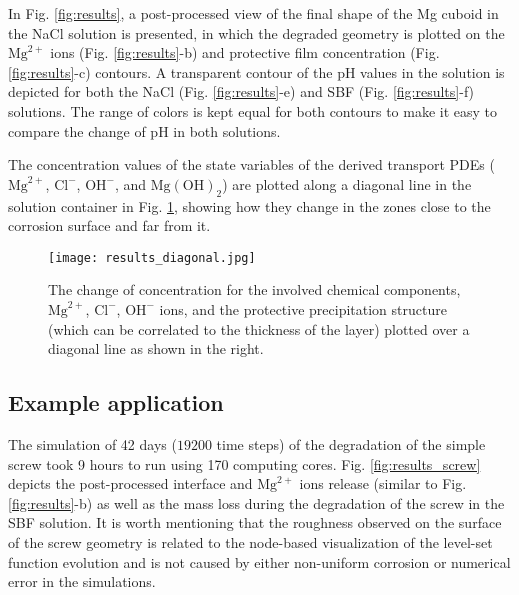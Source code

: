 In Fig. \ref{fig:results}, a post-processed view of the final shape of the Mg cuboid in the NaCl solution is presented, in which the degraded geometry is plotted on the $\mathrm{Mg}^{2+}$ ions (Fig. \ref{fig:results}-b) and protective film concentration (Fig. \ref{fig:results}-c) contours. A transparent contour of the pH values in the solution is depicted for both the NaCl (Fig. \ref{fig:results}-e) and \gls{SBF} (Fig. \ref{fig:results}-f) solutions. The range of colors is kept equal for both contours to make it easy to compare the change of pH in both solutions.


The concentration values of the state variables of the derived transport \gls{PDE}s ($\mathrm{Mg}^{2+}$, $\mathrm{Cl}^{-}$, $\mathrm{OH}^{-}$, and $\mathrm{Mg(OH)}_2$) are plotted along a diagonal line in the solution container in Fig. \ref{fig:results_diagonal}, showing how they change in the zones close to the corrosion surface and far from it. %


\begin{figure}[t]
\centering
\medskip
\texttt{[image: results\_diagonal.jpg]}
\caption[Change of concentration of various chemical components over a line]{The change of concentration for the involved chemical components, $\mathrm{Mg}^{2+}$, $\mathrm{Cl}^{-}$, $\mathrm{OH}^{-}$ ions, and the protective precipitation structure (which can be correlated to the thickness of the layer) plotted over a diagonal line as shown in the right.} \label{fig:results_diagonal}
\end{figure}

\subsection{Example application}

The simulation of 42 days ($\num{19200}$ time steps) of the degradation of the simple screw took 9 hours to run using 170 computing cores. Fig. \ref{fig:results_screw} depicts the post-processed interface and $\mathrm{Mg}^{2+}$ ions release (similar to Fig. \ref{fig:results}-b) as well as the mass loss during the degradation of the screw in the \gls{SBF} solution. It is worth mentioning that the roughness observed on the surface of the screw geometry is related to the node-based visualization of the level-set function evolution and is not caused by either non-uniform corrosion or numerical error in the simulations.

